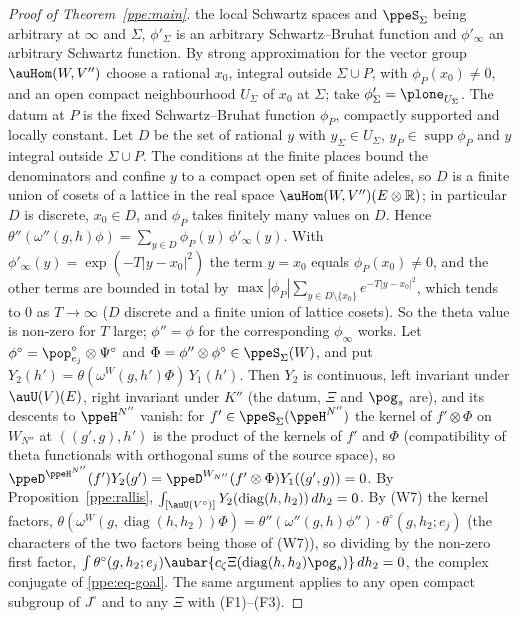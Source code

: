 \documentclass[10pt]{amsart}
\theoremstyle{definition}
\theoremstyle{remark}
\newcommand{\R}{\mathbb R}
\begin{document}
\begin{proof}[Proof of Theorem~\ref{ppe:main}]
the local Schwartz spaces and $\ppeS_\Sigma$ being arbitrary at $\infty$ and $\Sigma$,
$\phi'_\Sigma$ is an arbitrary Schwartz--Bruhat function and $\phi'_\infty$ an arbitrary Schwartz
function. By strong approximation for the vector group $\auHom(W,V'')$ choose a rational $x_0$,
integral outside $\Sigma\cup P$, with $\phi_P(x_0)\ne0$, and an open compact neighbourhood
$U_\Sigma$ of $x_0$ at $\Sigma$; take $\phi'_\Sigma=\plone_{U_\Sigma}$. The datum at $P$ is the fixed
Schwartz--Bruhat function $\phi_P$, compactly supported and locally constant. Let $D$ be the set of
rational $y$ with $y_\Sigma\in U_\Sigma$, $y_P\in\operatorname{supp}\phi_P$ and $y$ integral outside
$\Sigma\cup P$. The conditions at the finite places bound the denominators and confine $y$ to a
compact open set of finite adeles, so $D$ is a finite union of cosets of a lattice in the real space
$\auHom(W,V'')(E\otimes\R)$; in particular $D$ is discrete, $x_0\in D$, and $\phi_P$ takes finitely many
values on $D$. Hence
$\theta''(\omega''(g,h)\phi)=\sum_{y\in D}\phi_P(y)\,\phi'_\infty(y)$. With
$\phi'_\infty(y)=\exp(-T|y-x_0|^2)$ the term $y=x_0$ equals $\phi_P(x_0)\ne0$, and the other terms
are bounded in total by $\max|\phi_P|\sum_{y\in D\setminus\{x_0\}}e^{-T|y-x_0|^2}$, which tends to $0$
as $T\to\infty$ ($D$ discrete and a finite union of lattice cosets). So the theta value is non-zero
for $T$ large; $\phi''=\phi$ for the corresponding $\phi_\infty$ works. Let $\phi^\circ=
\pop^\circ_{e_j}\otimes\Psi^\circ$ and $\Phi=\phi''\otimes\phi^\circ\in\ppeS_\Sigma(W)$, and put
$Y_2(h')=\theta(\omega^W(g,h')\Phi)\,Y_1(h')$. Then $Y_2$ is continuous, left invariant under
$\auU(V)(E)$, right invariant under $K''$ (the datum, $\Xi$ and $\pog_s$ are), and its descents to
$\ppeH^{N''}$ vanish: for $f'\in\ppeS_\Sigma(\ppeH^{N''})$ the kernel of $f'\otimes\Phi$ on
$W_{N''}$ at $((g',g),h')$ is the product of the kernels of $f'$ and $\Phi$ (compatibility of theta
functionals with orthogonal sums of the source space), so $\ppeD^{\ppeH^{N''}}(f')Y_2(g')=
\ppeD^{W_{N''}}(f'\otimes\Phi)Y_1((g',g))=0$. By Proposition~\ref{ppe:rallis},
$\int_{[\auU(V^\circ)]}Y_2(\operatorname{diag}(h,h_2))\,dh_2=0$. By (W7) the kernel factors,
$\theta(\omega^W(g,\operatorname{diag}(h,h_2))\Phi)=\theta''(\omega''(g,h)\phi'')\cdot\theta^\circ(g,
h_2;e_j)$ (the characters of the two factors being those of (W7)), so dividing by the non-zero first
factor, $\int\theta^\circ(g,h_2;e_j)\aubar{c_\zeta\Xi(\operatorname{diag}(h,h_2)\pog_s)}\,dh_2=0$, the
complex conjugate of \eqref{ppe:eq-goal}. The same argument applies to any open compact subgroup of
$J^\circ$ and to any $\Xi$ with (F1)--(F3).
\end{proof}
\end{document}
